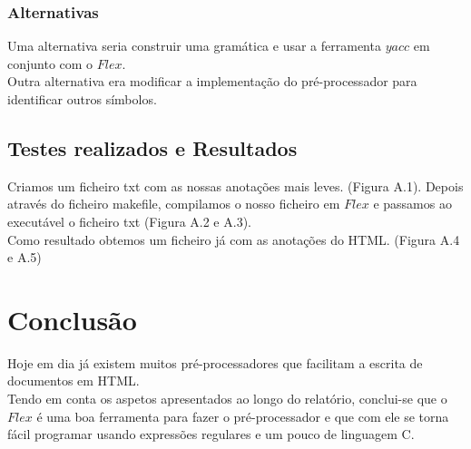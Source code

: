 \documentclass{report}
\begin{document}
\subsection{Alternativas}

Uma alternativa seria construir uma gramática e usar a ferramenta $yacc$ em conjunto com o $Flex$.\\
Outra alternativa era modificar a implementação do pré-processador para identificar outros símbolos.

\section{Testes realizados e Resultados}

Criamos um ficheiro txt com as nossas anotações mais leves. (Figura A.1). Depois através do ficheiro makefile, compilamos o nosso ficheiro em $Flex$ e passamos ao executável o ficheiro txt (Figura A.2 e A.3).\\ 
Como resultado obtemos um ficheiro já com as anotações do HTML. (Figura A.4 e A.5) 



\chapter{Conclusão} \label{concl}

Hoje em dia já existem muitos pré-processadores que facilitam a escrita de documentos em HTML.\\
Tendo em conta os aspetos apresentados ao longo do relatório, conclui-se que o $Flex$ é uma boa ferramenta para fazer o pré-processador e que com ele se torna fácil programar usando expressões regulares e um pouco de linguagem C. 



\appendix
\end{document}
